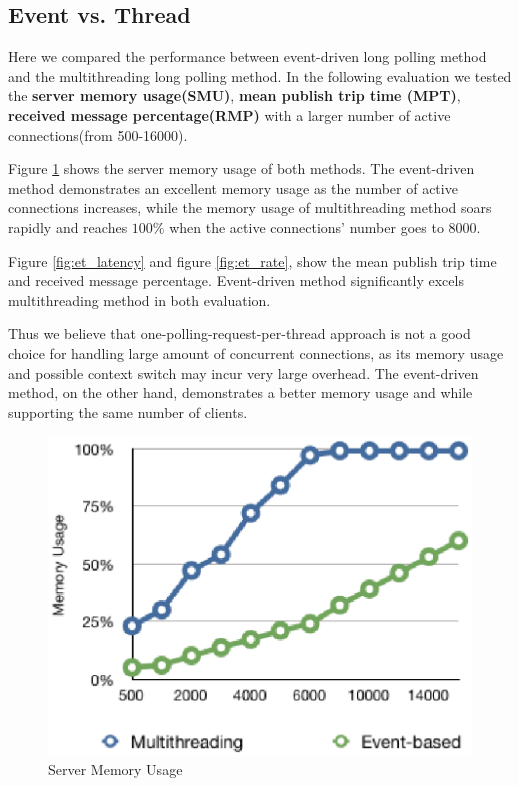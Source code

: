 \subsection{Event vs. Thread\\}

Here we compared the performance between event-driven long polling method
and the multithreading long polling method. In the following evaluation
we tested the {\bf server memory usage(SMU)}, {\bf mean publish trip time
(MPT)}, {\bf received message percentage(RMP)} with a larger number of
active connections(from 500-16000).

Figure \ref{fig:et_memory} shows the server memory usage of both methods.
The event-driven method demonstrates an excellent memory usage as the
number of active connections increases, while the memory usage of 
multithreading method soars rapidly and reaches $100\%$ when the active
connections' number goes to $8000$.

Figure \ref{fig:et_latency} and figure \ref{fig:et_rate}, show the mean
publish trip time and received message percentage. Event-driven method 
significantly excels multithreading method in both evaluation.

Thus we believe that one-polling-request-per-thread approach is not a good 
choice for handling large amount of concurrent connections, as its
memory usage and possible context switch may incur very large overhead.
The event-driven method, on the other hand, demonstrates a better 
memory usage and while supporting the same number of clients.  

\begin{figure}[htb!]
\centering%
    \includegraphics[scale=0.70]{figures/et_memory.eps}
    \caption{Server Memory Usage}
    \label{fig:et_memory}
\end{figure}

